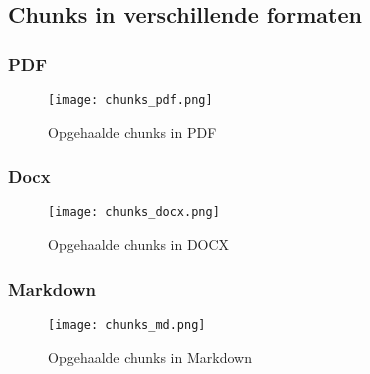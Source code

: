 \subsection{Chunks in verschillende formaten}
\label{chunks-verschillende-formaten}
\subsubsection{PDF}
\begin{figure}[H]
    \centering
    \texttt{[image: chunks\_pdf.png]}
    \caption{Opgehaalde chunks in PDF}
    \label{fig:chunks_pdf}
\end{figure}

\subsubsection{Docx}
\begin{figure}[H]
   \centering
   \texttt{[image: chunks\_docx.png]}
   \caption{Opgehaalde chunks in DOCX}
   \label{fig:chunks_doc}
\end{figure}


\subsubsection{Markdown}
\begin{figure}[H]
    \centering
    \texttt{[image: chunks\_md.png]}
    \caption{Opgehaalde chunks in Markdown}
    \label{fig:chunks_md}
\end{figure}

